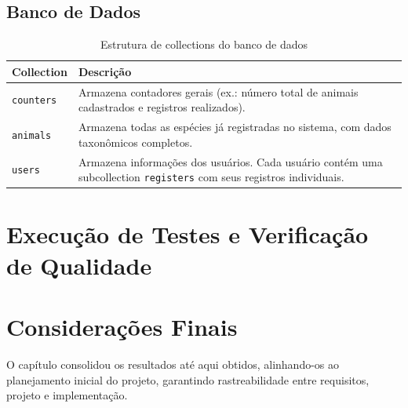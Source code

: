 \subsection{Banco de Dados}
\begin{table}[H]
    \centering
    \caption{Estrutura de collections do banco de dados}
    \label{tab:estrutura-dados}
    \begin{tabular}{|p{3cm}|p{10cm}|}
    \hline
    \textbf{Collection} & \textbf{Descrição} \\ \hline
    \texttt{counters} & Armazena contadores gerais (ex.: número total de animais cadastrados e registros realizados). \\ \hline
    \texttt{animals} & Armazena todas as espécies já registradas no sistema, com dados taxonômicos completos. \\ \hline
    \texttt{users} & Armazena informações dos usuários. Cada usuário contém uma subcollection \texttt{registers} com seus registros individuais. \\ \hline
    \end{tabular}
\end{table}

\section{Execução de Testes e Verificação de Qualidade}


\section*{Considerações Finais}

O capítulo consolidou os resultados até aqui obtidos, alinhando-os ao planejamento inicial do projeto, garantindo rastreabilidade entre requisitos, projeto e implementação.

